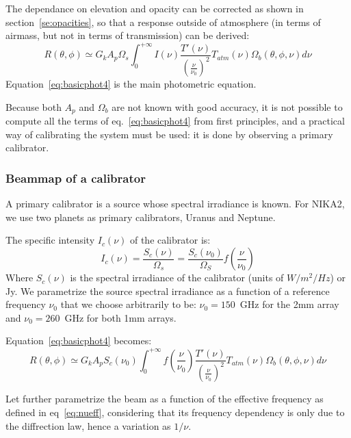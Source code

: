 The dependance on elevation and opacity can be corrected as shown in
section~\ref{se:opacities}, so that a response outside of atmosphere (in
terms of airmass, but not in terms of transmission) can be derived:
\begin{equation}
R(\theta, \phi) \simeq G_{k}  A_{p}\Omega_{s} \int_{0}^{+\infty} I(\nu)
\frac{T'(\nu)}{\left(\frac{\nu}{\nu_{0}}\right)^{2}} T_{atm}(\nu) \Omega_{b} (\theta, \phi, \nu)  d\nu 
\label{eq:basicphot4}
\end{equation}
Equation~\ref{eq:basicphot4} is the main photometric equation.

Because both $A_{p}$ and $ \Omega_{b} $ are not known with good
accuracy, it is not possible to compute all the terms of
eq.~\ref{eq:basicphot4} from first principles, and a practical way of
calibrating the system must be used: it is done by observing a primary
calibrator.

\subsubsection{Beammap of a calibrator}

A primary calibrator is a source whose spectral irradiance is
known. For NIKA2, we use two planets as primary calibrators, Uranus
and Neptune.



The specific intensity $I_{c}(\nu)$ of the
calibrator is:
\begin{equation}
I_{c}(\nu) =  \frac{S_{c}(\nu)}{\Omega_{s}} =\frac{ S_{c}
(\nu_{0})}{\Omega_{S}} f(\frac{\nu}{\nu_{0}})  
\end{equation}
Where $S_{c}(\nu)$ is the spectral irradiance of the calibrator (units
of $W/m^{2}/Hz$) or Jy. We parametrize the source spectral irradiance
as a function of a reference frequency $\nu_{0}$ that we choose
arbitrarily to be: $\nu_{0} = 150$~GHz for the 2mm array and $\nu_{0}
= 260$~GHz for both 1mm arrays. 


Equation~\ref{eq:basicphot4} becomes:
\begin{equation}
R(\theta, \phi) \simeq G_{k}  A_{p}  S_{c} (\nu_{0}) \int_{0}^{+\infty} f(\frac{\nu}{\nu_{0}})  
\frac{T'(\nu)}{\left(\frac{\nu}{\nu_{0}}\right)^{2}} T_{atm}(\nu) \Omega_{b} (\theta, \phi, \nu)  d\nu 
\label{eq:basicphot5}
\end{equation}

Let further parametrize the beam as a function
of the effective frequency as defined in eq~\ref{eq:nueff},
considering that its frequency dependency is only due to the diffrection law,
hence a variation as $1/\nu$.

